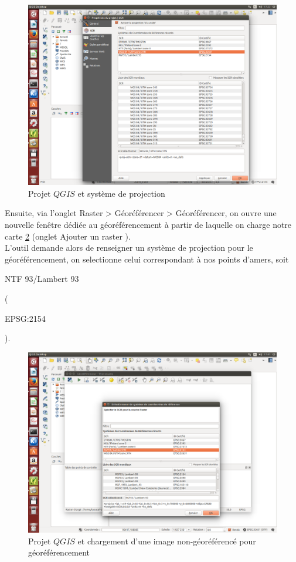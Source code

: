 \documentclass{book}
\begin{document}
\begin{figure}[H]
\begin{center}
\includegraphics[scale=0.3]{images/georeferencing/qgis-projet.png}
\end{center}
\caption{Projet $QGIS$ et système de projection}
\label{qgis-projet}
\end{figure}

Ensuite, via l'onglet \og Raster > Géoréférencer > Géoréférencer\fg{}, on ouvre 
une nouvelle fen\^{e}tre dédiée au géoréférencement à partir de laquelle on charge notre carte \ref{qgis-georef} 
(onglet \og Ajouter un raster \fg{}).\\
L'outil demande alors de renseigner un système de projection pour le géoréférencement, on selectionne celui correspondant 
à nos points d'amers, soit \begin{itshape}NTF 93/Lambert 93\end{itshape} (\begin{itshape}EPSG:2154\end{itshape}).

\begin{figure}[H]
\begin{center}
\includegraphics[scale=0.3]{images/georeferencing/qgis-georef.png}
\end{center}
\caption{Projet $QGIS$ et chargement d'une image non-géoréférencé pour géoréférencement}
\label{qgis-georef}
\end{figure}
\end{document}
